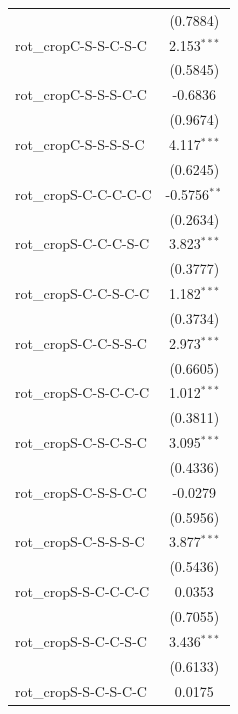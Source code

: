 \begin{table}[htbp]
\begin{tabular}{lc}
                                      & (0.7884)\\   
      rot\_cropC-S-S-C-S-C            & 2.153$^{***}$\\   
                                      & (0.5845)\\   
      rot\_cropC-S-S-S-C-C            & -0.6836\\   
                                      & (0.9674)\\   
      rot\_cropC-S-S-S-S-C            & 4.117$^{***}$\\   
                                      & (0.6245)\\   
      rot\_cropS-C-C-C-C-C            & -0.5756$^{**}$\\   
                                      & (0.2634)\\   
      rot\_cropS-C-C-C-S-C            & 3.823$^{***}$\\   
                                      & (0.3777)\\   
      rot\_cropS-C-C-S-C-C            & 1.182$^{***}$\\   
                                      & (0.3734)\\   
      rot\_cropS-C-C-S-S-C            & 2.973$^{***}$\\   
                                      & (0.6605)\\   
      rot\_cropS-C-S-C-C-C            & 1.012$^{***}$\\   
                                      & (0.3811)\\   
      rot\_cropS-C-S-C-S-C            & 3.095$^{***}$\\   
                                      & (0.4336)\\   
      rot\_cropS-C-S-S-C-C            & -0.0279\\   
                                      & (0.5956)\\   
      rot\_cropS-C-S-S-S-C            & 3.877$^{***}$\\   
                                      & (0.5436)\\   
      rot\_cropS-S-C-C-C-C            & 0.0353\\   
                                      & (0.7055)\\   
      rot\_cropS-S-C-C-S-C            & 3.436$^{***}$\\   
                                      & (0.6133)\\   
      rot\_cropS-S-C-S-C-C            & 0.0175\\   

\end{tabular}
\end{table}
